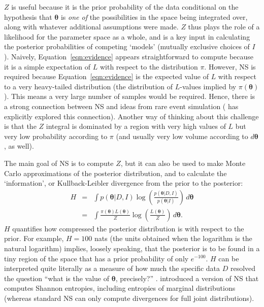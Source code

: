 \documentclass[entropy,article,submit,moreauthors,pdftex,10pt,a4paper]{Definitions/mdpi}
\newcommand{\xx}{\boldsymbol{\theta}}
\newcommand{\data}{D}
\newcommand{\II}{I}
\begin{document}
$Z$ is useful because it is the prior probability of the data conditional on
the hypothesis that $\xx$ is {\em one of}
the possibilities in the space being integrated over, along with
whatever additional assumptions were made. $Z$ thus plays the role
of a likelihood for the parameter space as a whole, and is a key input in
calculating the posterior probabilities of competing `models' (mutually
exclusive choices of $\II$).
Naively, Equation~\ref{eqn:evidence} appears straightforward to compute because
it is a simple expectation of $L$ with respect to the distribution $\pi$.
However,
NS is required because Equation~\ref{eqn:evidence}
is the expected value of $L$ with respect to a very heavy-tailed distribution
(the distribution of $L$-values implied by $\pi(\xx)$). This means a very
large number of samples would be required.
Hence, there is a strong
connection between NS and ideas from rare event simulation
(\citet{walter2017point} has explicitly explored this connection).
Another way of thinking about this
challenge is that the $Z$ integral is dominated by a region with very
high values of $L$ but very low probability according to $\pi$ (and usually
very low volume according to $d\xx$, as well).

The main goal of NS is to compute $Z$, but it can also be used to make
Monte Carlo approximations of the posterior distribution, and to
calculate the `information',
or Kullback-Leibler divergence from the prior to the posterior:
\begin{eqnarray}
H &=& \int p(\xx | \data, \II) \log
\left(\frac{p(\xx | \data, \II)}{p(\xx | \II)}\right) \, d\xx \\
&=& \int \frac{\pi(\xx) L(\xx)}{Z} \log
\left(\frac{L(\xx)}{Z}\right) \, d\xx.
\end{eqnarray}
$H$ quantifies how compressed the posterior distribution is with
respect to the prior. For example, $H = 100$ nats (the units obtained when
the logarithm is the natural logarithm) implies, loosely speaking,
that the posterior is to be found in a tiny region of the space that
has a prior probability of only $e^{-100}$.
$H$ can be interpreted quite literally as a measure of how much
the specific data $\data$ resolved the question ``what is the value
of $\xx$, precisely?'' \citep{knuth_questions, van2017inquiry}.
\citet{brewer2017computing} introduced a version of NS that computes
Shannon entropies, including entropies of marginal distributions (whereas
standard NS can only compute divergences for full joint distributions).
\end{document}
